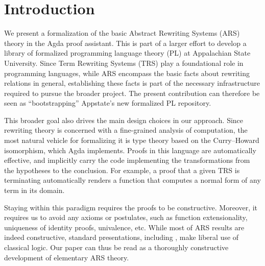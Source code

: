 \section{Introduction}
\label{sec:Introduction}

%


We present a formalization of the basic Abstract Rewriting Systems (ARS) theory in the Agda proof assistant.
This is part of a larger effort to develop a library of formalized programming language theory (PL)
at Appalachian State University.
Since Term Rewriting Systems (TRS) play a foundational role in programming languages,
while ARS encompass the basic facts about rewriting relations in general,
establishing these facts is part of the necessary infrastructure required to
pursue the broader project.  The present contribution can therefore be seen as
``bootstrapping'' Appstate's new formalized PL repository.

This broader goal also drives the main design choices in our approach.
Since rewriting theory is concerned with a fine-grained analysis of computation,
the most natural vehicle for formalizing it is type theory based on the
Curry--Howard isomorphism, which Agda implements.  Proofs in this language
are automatically effective, and implicitly carry the code implementing the
transformations from the hypotheses to the conclusion.  For example,
a proof that a given TRS is terminating automatically renders a function that
computes a normal form of any term in its domain.

Staying within this paradigm requires the proofs to be constructive.
Moreover, it requires us to avoid any axioms or postulates, such as function
extensionality, uniqueness of identity proofs, univalence, etc.
While most of ARS results are indeed constructive, standard presentations,
 including \hired{[Terese]}, make liberal use of classical logic.
Our paper can thus be read as a thoroughly constructive
development of elementary ARS theory.

